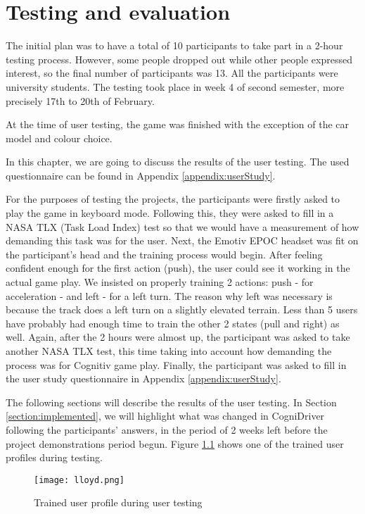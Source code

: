 \chapter{Testing and evaluation}
\label{cha:testing}

The initial plan was to have a total of 10 participants to take part in a 2-hour testing process. However, some people dropped out while other people expressed interest, so the final number of participants was 13. All the participants were university students. The testing took place in week 4 of second semester, more precisely 17th to 20th of February.

At the time of user testing, the game was finished with the exception of the car model and colour choice.

In this chapter, we are going to discuss the results of the user testing. The used questionnaire can be found in Appendix \ref{appendix:userStudy}. 

For the purposes of testing the projects, the participants were firstly asked to play the game in keyboard mode. Following this, they were asked to fill in a NASA TLX (Task Load Index) test so that we would have a measurement of how demanding this task was for the user. Next, the Emotiv EPOC headset was fit on the participant's head and the training process would begin. After feeling confident enough for the first action (push), the user could see it working in the actual game play. We insisted on properly training 2 actions: push - for acceleration - and left - for a left turn. The reason why left was necessary is because the track does a left turn on a slightly elevated terrain. Less than 5 users have probably had enough time to train the other 2 states (pull and right) as well. Again, after the 2 hours were almost up, the participant was asked to take another NASA TLX test, this time taking into account how demanding the process was for Cognitiv game play. Finally, the participant was asked to fill in the user study questionnaire in Appendix \ref{appendix:userStudy}. 

The following sections will describe the results of the user testing. In Section \ref{section:implemented}, we will highlight what was changed in CogniDriver following the participants' answers, in the period of 2 weeks left before the project demonstrations period begun. Figure \ref{fig:testing} shows one of the trained user profiles during testing.

\begin{figure}
  \centering
  \texttt{[image: lloyd.png]}
  \caption{Trained user profile during user testing}
    \label{fig:testing}           
\end{figure}

